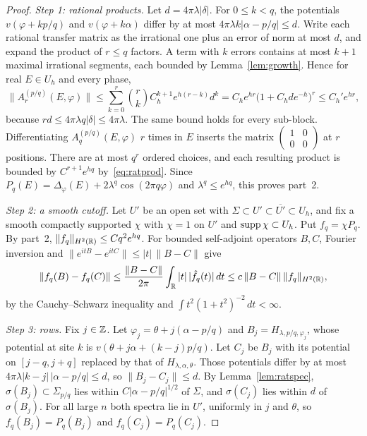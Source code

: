 \begin{proof}
\emph{Step 1: rational products.} Let $d=4\pi\lambda|\delta|$. For $0\le k<q$, the potentials $v(\varphi+kp/q)$ and $v(\varphi+k\alpha)$ differ by at most $4\pi\lambda k|\alpha-p/q|\le d$. Write each rational transfer matrix as the irrational one plus an error of norm at most $d$, and expand the product of $r\le q$ factors. A term with $k$ errors contains at most $k+1$ maximal irrational segments, each bounded by Lemma~\ref{lem:growth}. Hence for real $E\in U_h$ and every phase,
\begin{equation}\label{eq:ratprod}
\|A^{(p/q)}_r(E,\varphi)\|\le\sum_{k=0}^r\binom rk C_h^{k+1}e^{h(r-k)}d^k=C_he^{hr}\bigl(1+C_hde^{-h}\bigr)^r\le C_h'e^{hr},
\end{equation}
because $rd\le4\pi\lambda q|\delta|\le4\pi\lambda$. The same bound holds for every sub-block. Differentiating $A^{(p/q)}_q(E,\varphi)$ $r$ times in $E$ inserts the matrix $\begin{pmatrix}1&0\\0&0\end{pmatrix}$ at $r$ positions. There are at most $q^r$ ordered choices, and each resulting product is bounded by $C^{r+1}e^{hq}$ by~\eqref{eq:ratprod}. Since $P_q(E)=\Delta_\varphi(E)+2\lambda^q\cos(2\pi q\varphi)$ and $\lambda^q\le e^{hq}$, this proves part~2.

\emph{Step 2: a smooth cutoff.} Let $U'$ be an open set with $\Sigma\subset U'\subset\overline{U'}\subset U_h$, and fix a smooth compactly supported $\chi$ with $\chi=1$ on $U'$ and $\operatorname{supp}\chi\subset U_h$. Put $f_q=\chi P_q$. By part~2, $\|f_q\|_{H^2(\mathbb R)}\le Cq^2e^{hq}$. For bounded self-adjoint operators $B,C$, Fourier inversion and $\|e^{itB}-e^{itC}\|\le|t|\,\|B-C\|$ give
\[
\|f_q(B)-f_q(C)\|\le\frac{\|B-C\|}{2\pi}\int_\mathbb R|t|\,|\hat f_q(t)|\,dt\le c\,\|B-C\|\,\|f_q\|_{H^2(\mathbb R)},
\]
by the Cauchy--Schwarz inequality and $\int t^2(1+t^2)^{-2}\,dt<\infty$.

\emph{Step 3: rows.} Fix $j\in\mathbb Z$. Let $\varphi_j=\theta+j(\alpha-p/q)$ and $B_j=H_{\lambda,p/q,\varphi_j}$, whose potential at site $k$ is $v(\theta+j\alpha+(k-j)p/q)$. Let $C_j$ be $B_j$ with its potential on $[j-q,j+q]$ replaced by that of $H_{\lambda,\alpha,\theta}$. Those potentials differ by at most $4\pi\lambda|k-j|\,|\alpha-p/q|\le d$, so $\|B_j-C_j\|\le d$. By Lemma~\ref{lem:ratspec}, $\sigma(B_j)\subset\Sigma_{p/q}$ lies within $C|\alpha-p/q|^{1/2}$ of $\Sigma$, and $\sigma(C_j)$ lies within $d$ of $\sigma(B_j)$. For all large $n$ both spectra lie in $U'$, uniformly in $j$ and $\theta$, so $f_q(B_j)=P_q(B_j)$ and $f_q(C_j)=P_q(C_j)$.


\end{proof}

